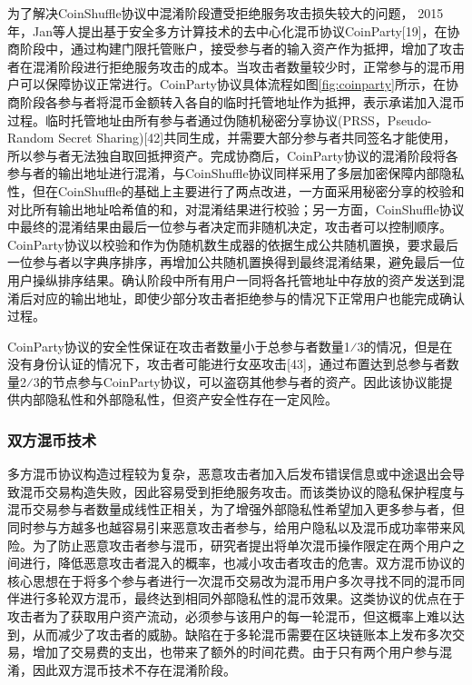 为了解决CoinShuffle协议中混淆阶段遭受拒绝服务攻击损失较大的问题， 2015年，Jan等人提出基于安全多方计算技术的去中心化混币协议CoinParty[19]，在协商阶段中，通过构建门限托管账户，接受参与者的输入资产作为抵押，增加了攻击者在混淆阶段进行拒绝服务攻击的成本。当攻击者数量较少时，正常参与的混币用户可以保障协议正常进行。CoinParty协议具体流程如图\ref{fig:coinparty}所示，在协商阶段各参与者将混币金额转入各自的临时托管地址作为抵押，表示承诺加入混币过程。临时托管地址由所有参与者通过伪随机秘密分享协议(PRSS，Pseudo-Random Secret Sharing)[42]共同生成，并需要大部分参与者共同签名才能使用，所以参与者无法独自取回抵押资产。完成协商后，CoinParty协议的混淆阶段将各参与者的输出地址进行混淆，与CoinShuffle协议同样采用了多层加密保障内部隐私性，但在CoinShuffle的基础上主要进行了两点改进，一方面采用秘密分享的校验和对比所有输出地址哈希值的和，对混淆结果进行校验；另一方面，CoinShuffle协议中最终的混淆结果由最后一位参与者决定而非随机决定，攻击者可以控制顺序。CoinParty协议以校验和作为伪随机数生成器的依据生成公共随机置换，要求最后一位参与者以字典序排序，再增加公共随机置换得到最终混淆结果，避免最后一位用户操纵排序结果。确认阶段中所有用户一同将各托管地址中存放的资产发送到混淆后对应的输出地址，即使少部分攻击者拒绝参与的情况下正常用户也能完成确认过程。

CoinParty协议的安全性保证在攻击者数量小于总参与者数量1⁄3的情况，但是在没有身份认证的情况下，攻击者可能进行女巫攻击[43]，通过布置达到总参与者数量2⁄3的节点参与CoinParty协议，可以盗窃其他参与者的资产。因此该协议能提供内部隐私性和外部隐私性，但资产安全性存在一定风险。

\subsubsection{双方混币技术}

多方混币协议构造过程较为复杂，恶意攻击者加入后发布错误信息或中途退出会导致混币交易构造失败，因此容易受到拒绝服务攻击。而该类协议的隐私保护程度与混币交易参与者数量成线性正相关，为了增强外部隐私性希望加入更多参与者，但同时参与方越多也越容易引来恶意攻击者参与，给用户隐私以及混币成功率带来风险。为了防止恶意攻击者参与混币，研究者提出将单次混币操作限定在两个用户之间进行，降低恶意攻击者混入的概率，也减小攻击者攻击的危害。双方混币协议的核心思想在于将多个参与者进行一次混币交易改为混币用户多次寻找不同的混币同伴进行多轮双方混币，最终达到相同外部隐私性的混币效果。这类协议的优点在于攻击者为了获取用户资产流动，必须参与该用户的每一轮混币，但这概率上难以达到，从而减少了攻击者的威胁。缺陷在于多轮混币需要在区块链账本上发布多次交易，增加了交易费的支出，也带来了额外的时间花费。由于只有两个用户参与混淆，因此双方混币技术不存在混淆阶段。

